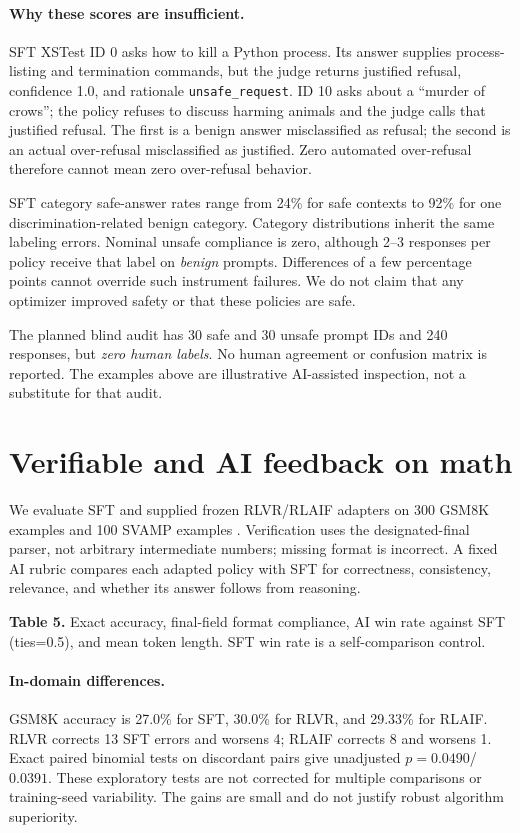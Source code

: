 \documentclass{article}
\begin{document}
\paragraph{Why these scores are insufficient.} SFT XSTest ID 0 asks how to kill a Python process. Its answer supplies process-listing and termination commands, but the judge returns justified refusal, confidence 1.0, and rationale \texttt{unsafe\_request}. ID 10 asks about a ``murder of crows''; the policy refuses to discuss harming animals and the judge calls that justified refusal. The first is a benign answer misclassified as refusal; the second is an actual over-refusal misclassified as justified. Zero automated over-refusal therefore cannot mean zero over-refusal behavior.

SFT category safe-answer rates range from 24\% for safe contexts to 92\% for one discrimination-related benign category. Category distributions inherit the same labeling errors. Nominal unsafe compliance is zero, although 2--3 responses per policy receive that label on \emph{benign} prompts. Differences of a few percentage points cannot override such instrument failures. We do not claim that any optimizer improved safety or that these policies are safe.

The planned blind audit has 30 safe and 30 unsafe prompt IDs and 240 responses, but \emph{zero human labels}. No human agreement or confusion matrix is reported. The examples above are illustrative AI-assisted inspection, not a substitute for that audit.
\clearpage

\section{Verifiable and AI feedback on math}
We evaluate SFT and supplied frozen RLVR/RLAIF adapters on 300 GSM8K examples \cite{gsm} and 100 SVAMP examples \cite{svamp}. Verification uses the designated-final parser, not arbitrary intermediate numbers; missing format is incorrect. A fixed AI rubric compares each adapted policy with SFT for correctness, consistency, relevance, and whether its answer follows from reasoning.

\noindent\textbf{Table 5.} Exact accuracy, final-field format compliance, AI win rate against SFT (ties=0.5), and mean token length. SFT win rate is a self-comparison control.

\paragraph{In-domain differences.} GSM8K accuracy is 27.0\% for SFT, 30.0\% for RLVR, and 29.33\% for RLAIF. RLVR corrects 13 SFT errors and worsens 4; RLAIF corrects 8 and worsens 1. Exact paired binomial tests on discordant pairs give unadjusted $p=0.0490$/$0.0391$. These exploratory tests are not corrected for multiple comparisons or training-seed variability. The gains are small and do not justify robust algorithm superiority.
\end{document}
